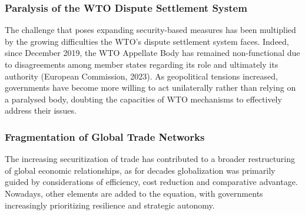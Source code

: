 \subsubsection{Paralysis of the WTO Dispute Settlement System}

The challenge that poses expanding security-based measures has been multiplied by the growing difficulties the WTO’s dispute settlement system faces. Indeed, since December 2019, the WTO Appellate Body has remained non-functional due to disagreements among member states regarding its role and ultimately its authority (European Commission, 2023). As geopolitical tensions increased, governments have become more willing to act unilaterally rather than relying on a paralysed body, doubting the capacities of WTO mechanisms to effectively address their issues.

\subsubsection{Fragmentation of Global Trade Networks}

The increasing securitization of trade has contributed to a broader restructuring of global economic relationships, as for decades globalization was primarily guided by considerations of efficiency, cost reduction and comparative advantage. Nowadays, other elements are added to the equation, with governments increasingly prioritizing resilience and strategic autonomy.

